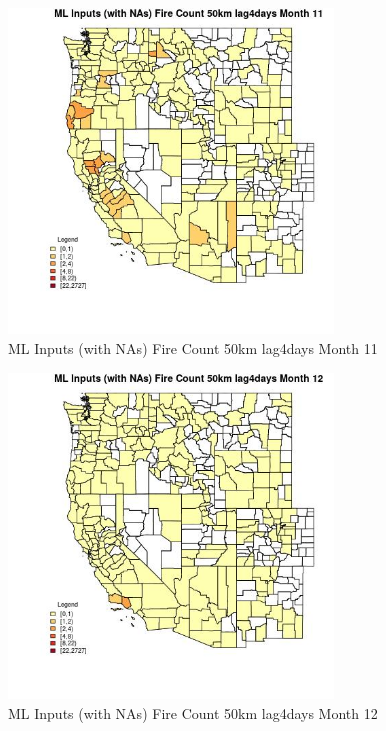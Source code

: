 \begin{figure} 
\centering  
\includegraphics[width=0.77\textwidth]{Code_Outputs/Report_ML_input_PM25_Step4_part_f_de_duplicated_aveswNAs_CountyFire_Count_50km_lag4daysmedianMonth11.jpg} 
\caption{\label{fig:Report_ML_input_PM25_Step4_part_f_de_duplicated_aveswNAsCountyFire_Count_50km_lag4daysmedianMonth11}ML Inputs (with NAs) Fire Count 50km lag4days Month 11} 
\end{figure} 
 

\begin{figure} 
\centering  
\includegraphics[width=0.77\textwidth]{Code_Outputs/Report_ML_input_PM25_Step4_part_f_de_duplicated_aveswNAs_CountyFire_Count_50km_lag4daysmedianMonth12.jpg} 
\caption{\label{fig:Report_ML_input_PM25_Step4_part_f_de_duplicated_aveswNAsCountyFire_Count_50km_lag4daysmedianMonth12}ML Inputs (with NAs) Fire Count 50km lag4days Month 12} 
\end{figure} 
 

